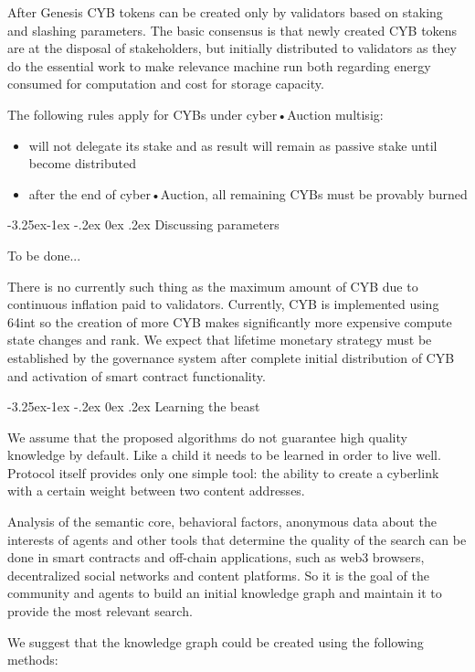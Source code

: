 \documentclass[8pt,oneside]{amsart}
\makeatletter
\renewcommand\subsection{\@startsection{subsection}{2}{\z@}%
                                     {-3.25ex\@plus -1ex \@minus -.2ex}%
                                     {0ex \@plus .2ex}%
                                     {\play\Large}}%
\newcommand{\titleSection}[1]{\subsection{#1}}
\makeatother
\begin{document}
After Genesis CYB tokens can be created only by validators based on staking and slashing parameters. The basic consensus is that newly created CYB tokens are at the disposal of stakeholders, but initially distributed to validators as they do the essential work to make relevance machine run both regarding energy consumed for computation and cost for storage capacity.

The following rules apply for CYBs under cyber•Auction multisig:

\begin{itemize}
\item will not delegate its stake and as result will remain as passive stake until become distributed
\item after the end of cyber•Auction, all remaining CYBs must be provably burned
\end{itemize}

\titleSection{Discussing parameters}\label{params}

To be done...

There is no currently such thing as the maximum amount of CYB due to continuous inflation paid to validators. Currently, CYB is implemented using 64int so the creation of more CYB makes significantly more expensive compute state changes and rank. We expect that lifetime monetary strategy must be established by the governance system after complete initial distribution of CYB and activation of smart contract functionality.


\titleSection{Learning the beast}\label{Learning the Graph}

We assume that the proposed algorithms do not guarantee high quality knowledge by default. Like a child it needs to be learned in order to live well. Protocol itself provides only one simple tool: the ability to create a cyberlink with a certain weight between two content addresses.

Analysis of the semantic core, behavioral factors, anonymous data about the interests of agents and other tools that determine the quality of the search can be done in smart contracts and off-chain applications, such as web3 browsers, decentralized social networks and content platforms. So it is the goal of the community and agents to build an initial knowledge graph and maintain it to provide the most relevant search.

We suggest that the knowledge graph could be created using the following methods:
\end{document}

